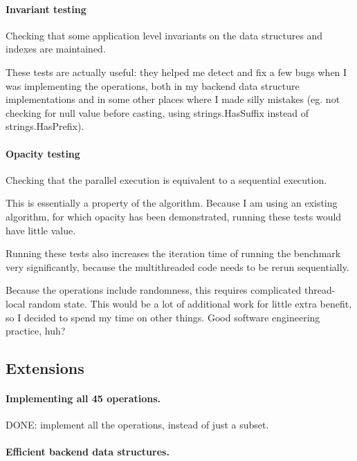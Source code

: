 \documentclass[12pt,a4paper,oneside,openright]{report}
\begin{document}
\paragraph{Invariant testing}
\label{sec:impl:invariant-testing}

Checking that some application level invariants on the data structures
and indexes are maintained.

These tests are actually useful: they helped me detect and fix a few
bugs when I was implementing the operations, both in my backend data
structure implementations and in some other places where I made silly
mistakes (eg. not checking for null value before casting, using
strings.HasSuffix instead of strings.HasPrefix).

\paragraph{Opacity testing}
\label{sec:impl:opacity-testing}

Checking that the parallel execution is equivalent to a sequential
execution.

This is essentially a property of the algorithm. Because I am using an
existing algorithm, for which opacity has been demonstrated, running
these tests would have little value.

Running these tests also increases the iteration time of running the
benchmark very significantly, because the multithreaded code needs to
be rerun sequentially.

Because the operations include randomness, this requires complicated
thread-local random state. This would be a lot of additional work for
little extra benefit, so I decided to spend my time on other
things. Good software engineering practice, huh?

\subsection{Extensions}
\label{sec:impl:possible-extensions}

\paragraph{Implementing all 45 operations.}
DONE: implement all the operations, instead of just a subset.

\paragraph{Efficient backend data structures.}
\end{document}
